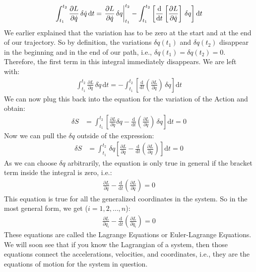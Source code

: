 \documentclass{article}
\begin{document}
	\begin{align}
		\int_{t_1}^{t_2}\frac{\partial L}{\partial \dot{q}}\,\delta\dot{q}\,\text{d}t=\eval{\frac{\partial L}{\partial \dot{q}}\,\delta q}_{t_1}^{t_2}-\int_{t_1}^{t_2}\left[\frac{\text{d}}{\text{d}t}\left[\frac{\partial L}{\partial \dot{q}}\right]\,\delta q\right]\text{d}t
	\end{align}
	We earlier explained that the variation has to be zero at the start and at the end of our trajectory. So by definition, the variations $\delta q(t_1)$ and $\delta q(t_2)$ disappear in the beginning and in the end of our path, i.e., $\delta q(t_1) = \delta q(t_2) = 0$. Therefore, the first term in this integral immediately disappears. We are left with: 
	\begin{align}
		\int_{t_1}^{t_2}\frac{\partial L}{\partial \dot{q}}\,\delta\dot{q}\,\text{d}t = -\int_{t_1}^{t_2}\left[\frac{\text{d}}{\text{d}t}\left(\frac{\partial L}{\partial \dot{q}}\right)\,\delta q\right]\text{d}t
	\end{align}
	We can now plug this back into the equation for the variation of the Action and obtain:
	\begin{align}
		\delta S &= \int_{t_1}^{t_2} \left[\frac{\partial L}{\partial q}\delta q -\frac{\text{d}}{\text{d}t}\left(\frac{\partial L}{\partial \dot{q}}\right)\,\delta q \right] \text{d}t=0 
	\end{align}
	Now we can pull the $\delta q$ outside of the expression: 
	\begin{align}
		\delta S &= \int_{t_1}^{t_2} \,\delta q \left[\frac{\partial L}{\partial q} -\frac{\text{d}}{\text{d}t}\left(\frac{\partial L}{\partial \dot{q}}\right)\right] \text{d}t=0 
	\end{align}
	As we can choose $\delta q$ arbitrarily, the equation is only true in general if the bracket term inside the integral is zero, i.e.: 
	\begin{align}
		\frac{\partial L}{\partial q}-\frac{\text{d}}{\text{d}t}\left(\frac{\partial L}{\partial \dot{q}}\right) = 0
	\end{align} 
	This equation is true for all the generalized coordinates in the system. So in the most general form, we get ($i=1,2, \dots ,n$):
	\begin{align}
		\frac{\partial L}{\partial q_i}-\frac{\text{d}}{\text{d}t}\left(\frac{\partial L}{\partial \dot{q_i}}\right) = 0
	\end{align}
	These equations are called the Lagrange Equations or Euler-Lagrange Equations.
	We will soon see that if you know the Lagrangian of a system, then those equations connect the accelerations, velocities, and coordinates, i.e., they are the equations of motion for the system in question.
	
\end{document}
